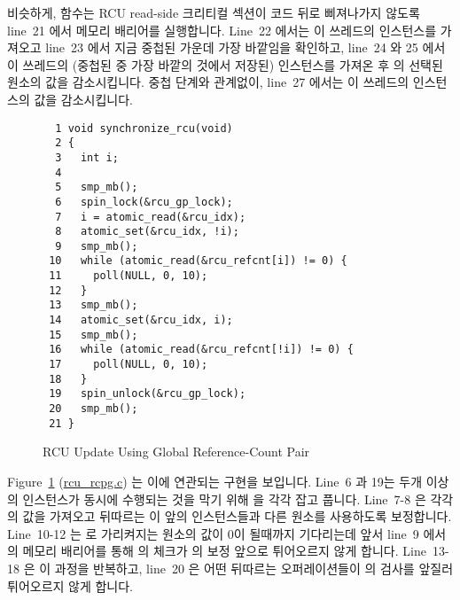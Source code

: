 비슷하게,  함수는 RCU read-side 크리티컬 섹션이
 코드 뒤로 삐져나가지 않도록 line~21 에서 메모리 배리어를
실행합니다.
Line~22 에서는 이 쓰레드의  인스턴스를 가져오고 line~23 에서
지금 중첩된  가운데 가장 바깥임을 확인하고, line~24 와 25
에서 이 쓰레드의 (중첩된  중 가장 바깥의 것에서 저장된)
 인스턴스를 가져온 후  의 선택된 원소의 값을
감소시킵니다.
중첩 단계와 관계없이, line~27 에서는 이 쓰레드의  인스턴스의
값을 감소시킵니다.
\iffalse

Similarly, the \co{rcu_read_unlock()} function executes a memory barrier
at line~21
to ensure that the RCU read-side critical section does not bleed out
after the \co{rcu_read_unlock()} code.
Line~22 picks up this thread's instance of \co{rcu_nesting}, and if
line~23 finds that this is the outermost \co{rcu_read_unlock()},
then lines~24 and 25 pick up this thread's instance of \co{rcu_read_idx}
(saved by the outermost \co{rcu_read_lock()}) and atomically decrements
the selected element of \co{rcu_refcnt}.
Regardless of the nesting level, line~27 decrements this thread's
instance of \co{rcu_nesting}.
\fi

\begin{figure}[tbp]
{ \scriptsize
\begin{verbatim}
  1 void synchronize_rcu(void)
  2 {
  3   int i;
  4
  5   smp_mb();
  6   spin_lock(&rcu_gp_lock);
  7   i = atomic_read(&rcu_idx);
  8   atomic_set(&rcu_idx, !i);
  9   smp_mb();
 10   while (atomic_read(&rcu_refcnt[i]) != 0) {
 11     poll(NULL, 0, 10);
 12   }
 13   smp_mb();
 14   atomic_set(&rcu_idx, i);
 15   smp_mb();
 16   while (atomic_read(&rcu_refcnt[!i]) != 0) {
 17     poll(NULL, 0, 10);
 18   }
 19   spin_unlock(&rcu_gp_lock);
 20   smp_mb();
 21 }
\end{verbatim}
}
\caption{RCU Update Using Global Reference-Count Pair}
\label{fig:defer:RCU Update Using Global Reference-Count Pair}
\end{figure}

Figure~\ref{fig:defer:RCU Update Using Global Reference-Count Pair}
(\url{rcu_rcpg.c})
는 이에 연관되는  구현을 보입니다.
Line~6 과 19는 두개 이상의  인스턴스가 동시에 수행되는
것을 막기 위해  을 각각 잡고 풉니다.
Line~7-8 은 각각  의 값을 가져오고 뒤따르는  이
앞의 인스턴스들과 다른  원소를 사용하도록 보정합니다.
Line~10-12 는  로 가리켜지는 원소의 값이 0이 될때까지 기다리는데
앞서 line~9 에서의 메모리 배리어를 통해  의 체크가  의
보정 앞으로 튀어오르지 않게 합니다.
Line~13-18 은 이 과정을 반복하고, line~20 은 어떤 뒤따르는 오퍼레이션들이
 의 검사를 앞질러 튀어오르지 않게 합니다.
\iffalse

